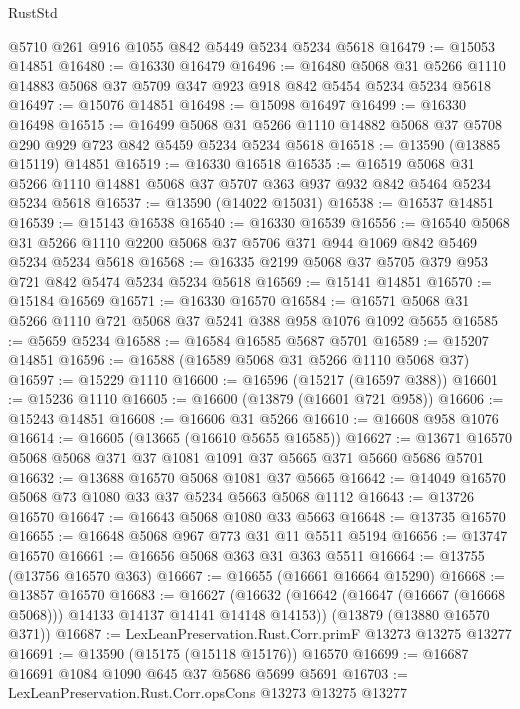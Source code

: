 \begin{lexlean}{RustStd}
\begin{coremodule}
    @5710
    @261
    @916
    @1055
    @842
    @5449
    @5234
    @5234
    @5618
@16479 := @15053 @14851
@16480 := @16330 @16479
@16496 := @16480
    @5068
    @31
    @5266
    @1110
    @14883
    @5068
    @37
    @5709
    @347
    @923
    @918
    @842
    @5454
    @5234
    @5234
    @5618
@16497 := @15076 @14851
@16498 := @15098 @16497
@16499 := @16330 @16498
@16515 := @16499
    @5068
    @31
    @5266
    @1110
    @14882
    @5068
    @37
    @5708
    @290
    @929
    @723
    @842
    @5459
    @5234
    @5234
    @5618
@16518 := @13590 (@13885 @15119) @14851
@16519 := @16330 @16518
@16535 := @16519
    @5068
    @31
    @5266
    @1110
    @14881
    @5068
    @37
    @5707
    @363
    @937
    @932
    @842
    @5464
    @5234
    @5234
    @5618
@16537 := @13590 (@14022 @15031)
@16538 := @16537 @14851
@16539 := @15143 @16538
@16540 := @16330 @16539
@16556 := @16540
    @5068
    @31
    @5266
    @1110
    @2200
    @5068
    @37
    @5706
    @371
    @944
    @1069
    @842
    @5469
    @5234
    @5234
    @5618
@16568 := @16335 @2199 @5068 @37 @5705 @379 @953 @721 @842 @5474 @5234 @5234 @5618
@16569 := @15141 @14851
@16570 := @15184 @16569
@16571 := @16330 @16570
@16584 := @16571 @5068 @31 @5266 @1110 @721 @5068 @37 @5241 @388 @958 @1076 @1092 @5655
@16585 := @5659 @5234
@16588 := @16584 @16585 @5687 @5701
@16589 := @15207 @14851
@16596 := @16588 (@16589 @5068 @31 @5266 @1110 @5068 @37)
@16597 := @15229 @1110
@16600 := @16596 (@15217 (@16597 @388))
@16601 := @15236 @1110
@16605 := @16600 (@13879 (@16601 @721 @958))
@16606 := @15243 @14851
@16608 := @16606 @31 @5266
@16610 := @16608 @958 @1076
@16614 := @16605 (@13665 (@16610 @5655 @16585))
@16627 := @13671 @16570 @5068 @5068 @371 @37 @1081 @1091 @37 @5665 @371 @5660 @5686 @5701
@16632 := @13688 @16570 @5068 @1081 @37 @5665
@16642 := @14049 @16570 @5068 @73 @1080 @33 @37 @5234 @5663 @5068 @1112
@16643 := @13726 @16570
@16647 := @16643 @5068 @1080 @33 @5663
@16648 := @13735 @16570
@16655 := @16648 @5068 @967 @773 @31 @11 @5511 @5194
@16656 := @13747 @16570
@16661 := @16656 @5068 @363 @31 @363 @5511
@16664 := @13755 (@13756 @16570 @363)
@16667 := @16655 (@16661 @16664 @15290)
@16668 := @13857 @16570
@16683 := @16627
    (@16632 (@16642 (@16647 (@16667 (@16668 @5068))) @14133 @14137 @14141 @14148 @14153))
    (@13879 (@13880 @16570 @371))
@16687 := LexLeanPreservation.Rust.Corr.primF @13273 @13275 @13277
@16691 := @13590 (@15175 (@15118 @15176)) @16570
@16699 := @16687 @16691 @1084 @1090 @645 @37 @5686 @5699 @5691
@16703 := LexLeanPreservation.Rust.Corr.opsCons @13273 @13275 @13277

\end{coremodule}
\end{lexlean}
